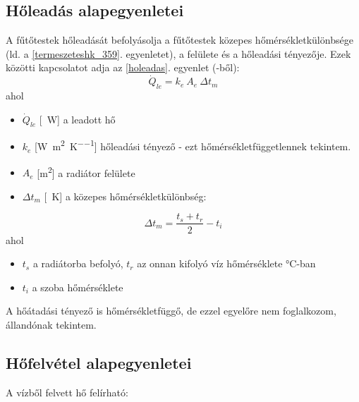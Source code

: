\subsection{Hőleadás alapegyenletei}
A fűtőtestek hőleadását befolyásolja a fűtőtestek közepes hőmérsékletkülönbsége (ld. a \ref{termeszeteshk_359}. egyenletet), a felülete és a hőleadási tényezője.
%
Ezek közötti kapcsolatot adja az \ref{holeadas}. egyenlet (\cite[358.~o.]{Herz}-ből): 
\begin{equation} \label{holeadas}
\dot Q_{le} = k_e ~ A_e ~ \Delta t_m
\end{equation}
%
%
ahol
\begin{itemize}[itemsep=6pt,topsep=0pt,parsep=0pt,partopsep=0pt]
\item[] $\dot{Q}_{le}$ [\SI{}{\watt}] a leadott hő
\item[] $k_e$ [\si[per-mode = fraction]{\watt\per\meter\squared\per\kelvin}] hőleadási tényező - ezt hőmérsékletfüggetlennek tekintem.
\item[] $A_e$ [\si{\metre\squared}] a radiátor felülete
\item[] $\Delta t_m$ [\SI{}{\kelvin}] a közepes hőmérsékletkülönbség:
\end{itemize}
%
\begin{equation} \label{termeszeteshk_359}
\Delta t_m = \frac{t_s+t_r}{2} -t_{i}
\end{equation}
ahol
%
\begin{itemize}[itemsep=6pt,topsep=0pt,parsep=0pt,partopsep=0pt]
	\item[] $t_s$ a radiátorba befolyó, $t_r$ az onnan kifolyó víz hőmérséklete \si{\degreeCelsius}-ban
	\item[] $t_i$ a szoba hőmérséklete
\end{itemize}
%
A hőátadási tényező is hőmérsékletfüggő, de ezzel egyelőre nem foglalkozom, állandónak tekintem.
%
%
%
%

\subsection{Hőfelvétel alapegyenletei}
A vízből felvett hő felírható:

